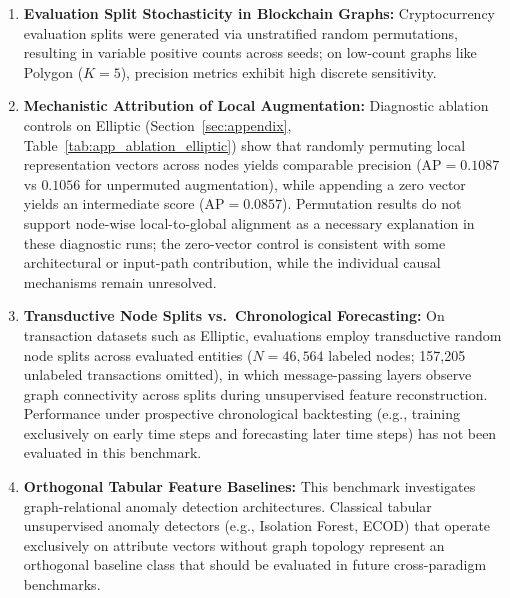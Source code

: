 \documentclass[11pt,a4paper]{article}
\begin{document}
\begin{enumerate}
    \item \textbf{Evaluation Split Stochasticity in Blockchain Graphs:} Cryptocurrency evaluation splits were generated via unstratified random permutations, resulting in variable positive counts across seeds; on low-count graphs like Polygon ($K=5$), precision metrics exhibit high discrete sensitivity.
    \item \textbf{Mechanistic Attribution of Local Augmentation:} Diagnostic ablation controls on Elliptic (Section~\ref{sec:appendix}, Table~\ref{tab:app_ablation_elliptic}) show that randomly permuting local representation vectors across nodes yields comparable precision ($\mathrm{AP} = 0.1087$ vs $0.1056$ for unpermuted augmentation), while appending a zero vector yields an intermediate score ($\mathrm{AP} = 0.0857$). Permutation results do not support node-wise local-to-global alignment as a necessary explanation in these diagnostic runs; the zero-vector control is consistent with some architectural or input-path contribution, while the individual causal mechanisms remain unresolved.
    \item \textbf{Transductive Node Splits vs.\ Chronological Forecasting:} On transaction datasets such as Elliptic, evaluations employ transductive random node splits across evaluated entities ($N=46{,}564$ labeled nodes; 157,205 unlabeled transactions omitted), in which message-passing layers observe graph connectivity across splits during unsupervised feature reconstruction. Performance under prospective chronological backtesting (e.g., training exclusively on early time steps and forecasting later time steps) has not been evaluated in this benchmark.
    \item \textbf{Orthogonal Tabular Feature Baselines:} This benchmark investigates graph-relational anomaly detection architectures. Classical tabular unsupervised anomaly detectors (e.g., Isolation Forest, ECOD) that operate exclusively on attribute vectors without graph topology represent an orthogonal baseline class that should be evaluated in future cross-paradigm benchmarks.
\end{enumerate}
\end{document}
